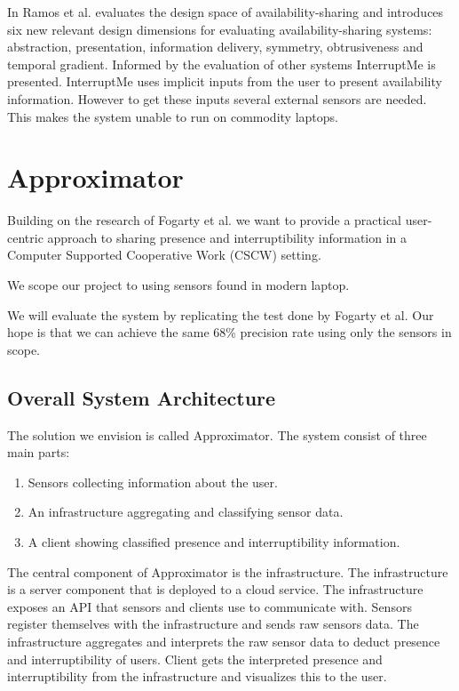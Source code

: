 \documentclass{sigchi}
\begin{document}
In \cite{hincapie2011design} Ramos et al. evaluates the design space of availability-sharing and introduces six new relevant design dimensions for evaluating availability-sharing systems: abstraction, presentation, information delivery, symmetry, obtrusiveness and temporal gradient.
Informed by the evaluation of other systems InterruptMe is presented.
InterruptMe uses implicit inputs from the user to present availability information.
However to get these inputs several external sensors are needed.
This makes the system unable to run on commodity laptops.

\section{Approximator}
Building on the research of Fogarty et al.\cite{fogarty2005predicting} we want to provide a practical user-centric approach to sharing presence and interruptibility information in a Computer Supported Cooperative Work (CSCW) setting.

 We scope our project to using sensors found in modern laptop.

 We will evaluate the system by replicating the test done by Fogarty et al.
 Our hope is that we can achieve the same 68\% precision rate using only the sensors in scope.

\subsection{Overall System Architecture}
The solution we envision is called Approximator.
The system consist of three main parts:
\begin{enumerate}
  \item Sensors collecting information about the user.
  \item An infrastructure aggregating and classifying sensor data.
  \item A client showing classified presence and interruptibility information.
\end{enumerate}

The central component of Approximator is the infrastructure.
The infrastructure is a server component that is deployed to a cloud service.
The infrastructure exposes an API that sensors and clients use to communicate with.
Sensors register themselves with the infrastructure and sends raw sensors data.
The infrastructure aggregates and interprets the raw sensor data to deduct presence and interruptibility of users.
Client gets the interpreted presence and interruptibility from the infrastructure and visualizes this to the user.
\end{document}
